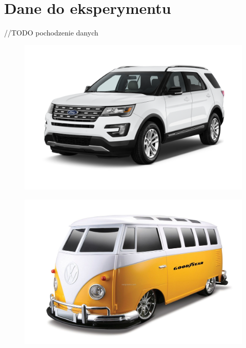 \documentclass{article}
\begin{document}
\section{Dane do eksperymentu}
//TODO pochodzenie danych
\begin{figure}[H]
\begin{center}
\includegraphics[width=1\textwidth]{../imgs_easy/suv_07.png}
\end{center}
\label{fig: wykres1}
\end{figure}
\begin{figure}[H]
\begin{center}
\includegraphics[width=1\textwidth]{../imgs_easy/van_19.jpg}
\end{center}
\label{fig: wykres2}
\end{figure}
\end{document}
